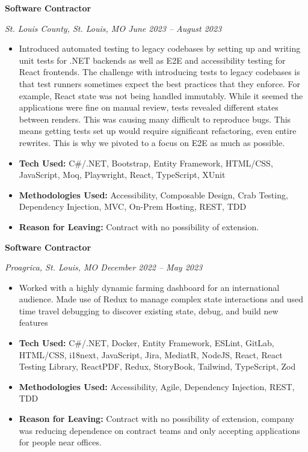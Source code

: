 \documentclass[a4ppaper, 10pt]{article}
\newcommand{\subheading}[1]{\vspace{2pt}\noindent\textbf{#1}\par}
\begin{document}
	\subheading{Software Contractor}
	\raggedright
	\textit{St. Louis County, St. Louis, MO \hfill June 2023 -- August 2023}
	\begin{itemize}[itemsep=0pt, topsep=2pt]
		\item Introduced automated testing to legacy codebases by setting up and writing unit tests for .NET backends as well as E2E and accessibility testing for React frontends. The challenge with introducing tests to legacy codebases is that test runners sometimes expect the best practices that they enforce. For example, React state was not being handled immutably. While it seemed the applications were fine on manual review, tests revealed different states between renders. This was causing many difficult to reproduce bugs. This means getting tests set up would require significant refactoring, even entire rewrites. This is why we pivoted to a focus on E2E as much as possible.
		\item \textbf{Tech Used:} C\#/.NET, Bootstrap, Entity Framework, HTML/CSS, JavaScript, Moq, Playwright, React, TypeScript, XUnit
		\item \textbf{Methodologies Used:} Accessibility, Composable Design, Crab Testing, Dependency Injection, MVC, On-Prem Hosting, REST, TDD
		\item \textbf{Reason for Leaving:} Contract with no possibility of extension.
	\end{itemize}
	
	\pagebreak
	
	\subheading{Software Contractor}
	\raggedright
	\textit{Proagrica, St. Louis, MO \hfill December 2022 -- May 2023}
	\begin{itemize}[itemsep=0pt, topsep=2pt]
		\item Worked with a highly dynamic farming dashboard for an international audience. Made use of Redux to manage complex state interactions and used time travel debugging to discover existing state, debug, and build new features
		\item \textbf{Tech Used:} C\#/.NET, Docker, Entity Framework, ESLint, GitLab, HTML/CSS, i18next, JavaScript, Jira, MediatR, NodeJS, React, React Testing Library, ReactPDF, Redux, StoryBook, Tailwind, TypeScript, Zod
		\item \textbf{Methodologies Used:} Accessibility, Agile, Dependency Injection, REST, TDD
		\item \textbf{Reason for Leaving:} Contract with no possibility of extension, company was reducing dependence on contract teams and only accepting applications for people near offices.
	\end{itemize}
	
\end{document}
